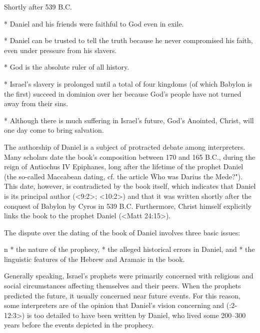  Shortly after 539 B.C.


\begitems
* Daniel and his friends were faithful to God even in exile.

* Daniel can be trusted to tell the truth because he never compromised his faith, even under pressure from his slavers.

* God is the absolute ruler of all history.

* Israel's slavery is prolonged until a total of four kingdoms (of which Babylon is the first) succeed in dominion over her because God's people have not turned away from their sins. 

* Although there is much suffering in Israel's future, God's Anointed, Christ, will one day come to bring salvation.



\enditems



The authorship of Daniel is a subject of protracted debate among interpreters.
Many scholars date the book's composition between 170 and 165 B.C., during the reign of Antiochus IV Epiphanes, long after the lifetime of the prophet Daniel (the so-called {Maccabean} dating, cf. the article \"Who was Darius the Mede?"). 
This date, however, is contradicted by the book itself, which indicates that Daniel is its principal author (<9:2>; <10:2>) and that it was written shortly after the conquest of Babylon by Cyros %
in 539 B.C. Furthermore, Christ himself explicitly links the book to the prophet Daniel (<Matt 24:15>).

 
The dispute over the dating of the book of Daniel involves three basic issues:

\begitems\style n
* the nature of the prophecy,
* the alleged historical errors in Daniel, and 
* the linguistic features of the Hebrew and Aramaic in the book.
\enditems

Generally speaking, Israel's prophets were primarily concerned with religious and social circumstances affecting themselves and their peers. When the prophets predicted the future, it usually concerned near future events.
For this reason, some interpreters are of the opinion that Daniel's vision concerning  and  (:2-12:3>) is too detailed to have been written by Daniel, who lived some 200--300 years before the events depicted in the prophecy.

